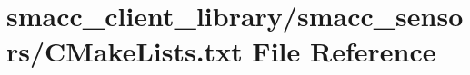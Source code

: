 \hypertarget{client__library_2smacc__sensors_2CMakeLists_8txt}{}\section{smacc\+\_\+client\+\_\+library/smacc\+\_\+sensors/\+C\+Make\+Lists.txt File Reference}
\label{client__library_2smacc__sensors_2CMakeLists_8txt}
